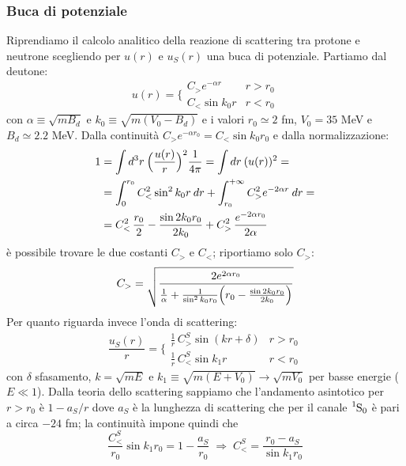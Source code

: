 \subsubsection{Buca di potenziale} Riprendiamo il calcolo analitico della reazione di scattering tra protone e neutrone scegliendo per $u(r)$ e $u_S(r)$ una buca di potenziale. Partiamo dal deutone:
$$u(r) = \Biggl \{%
\begin{array}{ll}
    C_>e^{-\alpha r} & r>r_0  \\
    C_<\sin{k_0r} & r<r_0
\end{array}%
$$
con $\alpha \equiv \sqrt{mB_d}$ e $k_0\equiv \sqrt{m(V_0-B_d)}$ e i valori $r_0\simeq 2$ fm, $V_0 = 35$ MeV e $B_d \simeq 2.2$ MeV. 
Dalla continuità $C_> e^{-\alpha r_0} = C_<\sin{k_0r_0}$ e dalla normalizzazione:
\begin{displaymath}
\begin{aligned}
1 &= \int d^3r\: \Bigl ( \frac{u(r)}{r} \Bigr )^2 \frac{1}{4\pi} = \int dr \: (u(r))^2 = \\
&= \int_0^{r_0} C_<^2\sin^2{k_0r} \: dr + \int_{r_0}^{+\infty} C_>^2 e^{-2\alpha r} \: dr =\\
&= C_<^2 \, \frac{r_0}{2} - \frac{\sin{2k_0r_0}}{2k_0} + C_>^2 \, \frac{e^{-2\alpha r_0}}{2\alpha}
\end{aligned}
\end{displaymath}
è possibile trovare le due costanti $C_>$ e $C_<$; riportiamo solo $C_>$:
$$C_> = \sqrt{\frac{2e^{2\alpha r_0}}{\frac{1}{\alpha} +\frac{1}{\sin^2{k_0r_0}}\Bigl ( r_0-\frac{\sin{2k_0r_0}}{2k_0} \Bigr )}}$$
Per quanto riguarda invece l'onda di scattering:
$$\frac{u_S(r)}{r} = \Biggl \{%
\begin{array}{ll}
   \frac{1}{r}\, C^S_>\sin{(kr + \delta)} & r>r_0  \\
   \frac{1}{r}\, C^S_<\sin{k_1r} & r<r_0
\end{array}%
$$
con $\delta$ sfasamento, $k=\sqrt{mE}$ e $k_1\equiv\sqrt{m(E+V_0)}\to\sqrt{mV_0}$ per basse energie ($E\ll 1$). Dalla teoria dello scattering sappiamo che l'andamento asintotico per $r>r_0$ è $1-a_S/r$ dove $a_S$ è la lunghezza di scattering che per il canale $\ce{^1S_0}$ è pari a circa $-24$ fm; la continuità impone quindi che 
$$\frac{C^S_{<}}{r_0}\sin{k_1r_0}=1-\frac{a_S}{r_0} \;\Rightarrow\; C^S_{<} = \frac{r_0 - a_S}{\sin{k_1r_0}}$$
